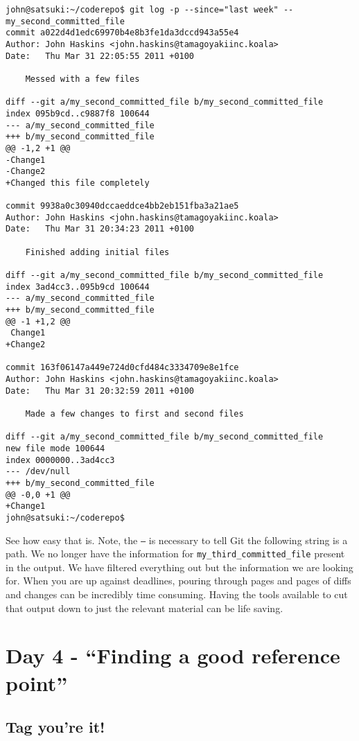 \begin{Verbatim}
john@satsuki:~/coderepo$ git log -p --since="last week" -- 
my_second_committed_file
commit a022d4d1edc69970b4e8b3fe1da3dccd943a55e4
Author: John Haskins <john.haskins@tamagoyakiinc.koala>
Date:   Thu Mar 31 22:05:55 2011 +0100

    Messed with a few files

diff --git a/my_second_committed_file b/my_second_committed_file
index 095b9cd..c9887f8 100644
--- a/my_second_committed_file
+++ b/my_second_committed_file
@@ -1,2 +1 @@
-Change1
-Change2
+Changed this file completely

commit 9938a0c30940dccaeddce4bb2eb151fba3a21ae5
Author: John Haskins <john.haskins@tamagoyakiinc.koala>
Date:   Thu Mar 31 20:34:23 2011 +0100

    Finished adding initial files

diff --git a/my_second_committed_file b/my_second_committed_file
index 3ad4cc3..095b9cd 100644
--- a/my_second_committed_file
+++ b/my_second_committed_file
@@ -1 +1,2 @@
 Change1
+Change2

commit 163f06147a449e724d0cfd484c3334709e8e1fce
Author: John Haskins <john.haskins@tamagoyakiinc.koala>
Date:   Thu Mar 31 20:32:59 2011 +0100

    Made a few changes to first and second files

diff --git a/my_second_committed_file b/my_second_committed_file
new file mode 100644
index 0000000..3ad4cc3
--- /dev/null
+++ b/my_second_committed_file
@@ -0,0 +1 @@
+Change1
john@satsuki:~/coderepo$ 
\end{Verbatim}

See how easy that is.  Note, the \texttt{--} is necessary to tell Git the following string is a path.  We no longer have the information for \texttt{my\_third\_committed\_file} present in the output.  We have filtered everything out but the information we are looking for.  When you are up against deadlines, pouring through pages and pages of diffs and changes can be incredibly time consuming.  Having the tools available to cut that output down to just the relevant material can be life saving.

\section{Day 4 - ``Finding a good reference point''}
\subsection{Tag you're it!}

